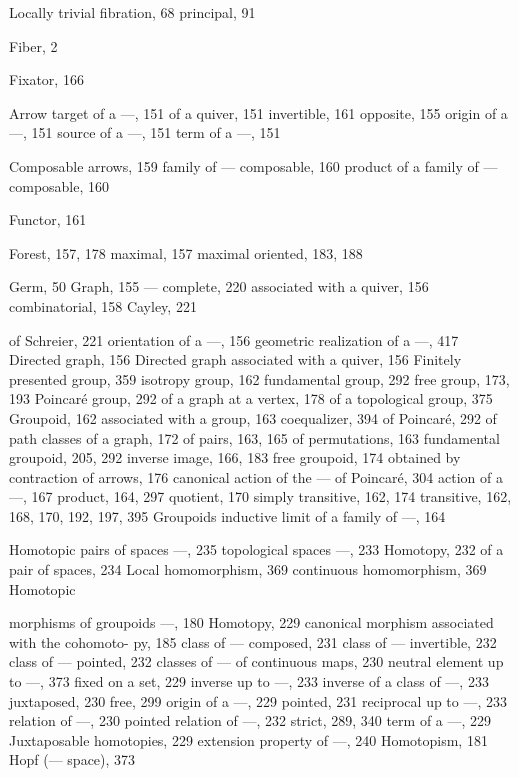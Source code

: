 Locally trivial fibration, 68 principal, 91

Fiber, 2

Fixator, 166

Arrow target of a ---, 151 of a quiver, 151 invertible, 161 opposite, 155 origin of a ---, 151 source of a ---, 151 term of a ---, 151

Composable arrows, 159 family of --- composable, 160 product of a family of --- composable, 160

Functor, 161

Forest, 157, 178 maximal, 157 maximal oriented, 183, 188


Germ, 50 Graph, 155 --- complete, 220 associated with a quiver, 156 combinatorial, 158 Cayley, 221

of Schreier, 221 orientation of a ---, 156 geometric realization of a ---, 417 Directed graph, 156 Directed graph associated with a quiver, 156 Finitely presented group, 359 isotropy group, 162 fundamental group, 292 free group, 173, 193 Poincaré group, 292 of a graph at a vertex, 178 of a topological group, 375 Groupoid, 162 associated with a group, 163 coequalizer, 394 of Poincaré, 292 of path classes of a graph, 172 of pairs, 163, 165 of permutations, 163 fundamental groupoid, 205, 292 inverse image, 166, 183 free groupoid, 174 obtained by contraction of arrows, 176 canonical action of the --- of Poincaré, 304 action of a ---, 167 product, 164, 297 quotient, 170 simply transitive, 162, 174 transitive, 162, 168, 170, 192, 197, 395 Groupoids inductive limit of a family of ---, 164


Homotopic pairs of spaces ---, 235 topological spaces ---, 233 Homotopy, 232 of a pair of spaces, 234 Local homomorphism, 369 continuous homomorphism, 369 Homotopic

morphisms of groupoids ---, 180 Homotopy, 229 canonical morphism associated with the cohomoto- py, 185 class of --- composed, 231 class of --- invertible, 232 class of --- pointed, 232 classes of --- of continuous maps, 230 neutral element up to ---, 373 fixed on a set, 229 inverse up to ---, 233 inverse of a class of ---, 233 juxtaposed, 230 free, 299 origin of a ---, 229 pointed, 231 reciprocal up to ---, 233 relation of ---, 230 pointed relation of ---, 232 strict, 289, 340 term of a ---, 229 Juxtaposable homotopies, 229 extension property of ---, 240 Homotopism, 181 Hopf (--- space), 373


